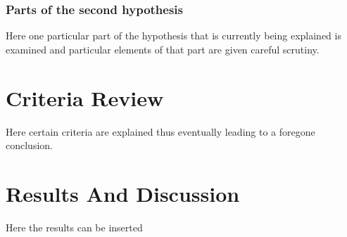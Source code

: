 \subsubsection{Parts of the second hypothesis}

Here one particular part of the hypothesis that is 
currently being explained is examined and particular
elements of that part are given careful scrutiny.

\section{Criteria Review}

Here certain criteria are explained thus eventually
leading to a foregone conclusion.

\section{Results And Discussion}

Here the results can be inserted



%
%

